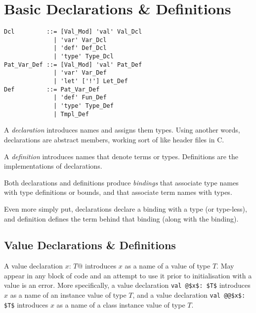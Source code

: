 
\chapter{Basic Declarations \& Definitions}

\syntax\begin{lstlisting}
Dcl         ::= [Val_Mod] 'val' Val_Dcl
              | 'var' Var_Dcl
              | 'def' Def_Dcl
              | 'type' Type_Dcl
Pat_Var_Def ::= [Val_Mod] 'val' Pat_Def
              | 'var' Var_Def
              | 'let' ['!'] Let_Def
Def         ::= Pat_Var_Def
              | 'def' Fun_Def
              | 'type' Type_Def
              | Tmpl_Def
\end{lstlisting}

A {\em declaration} introduces names and assigns them types. Using another words, declarations are abstract members, working sort of like header files in C. 

A {\em definition} introduces names that denote terms or types. Definitions are the implementations of declarations. 

Both declarations and definitions produce {\em bindings} that associate type names with type definitions or bounds, and that associate term names with types. 

Even more simply put, declarations declare a binding with a type (or type-less), and definition defines the term behind that binding (along with the binding). 


\section{Value Declarations \& Definitions}
\label{sec:value-dcl-def}

A value declaration \lstinline@val $x$: $T$@ introduces $x$ as a name of a value of type $T$. May appear in any block of code and an attempt to use it prior to initialisation with a value is an error. More specifically, a value declaration \lstinline+val @$x$: $T$+ introduces $x$ as a name of an instance value of type $T$, and a value declaration \lstinline+val @@$x$: $T$+ introduces $x$ as a name of a class instance value of type $T$. 

